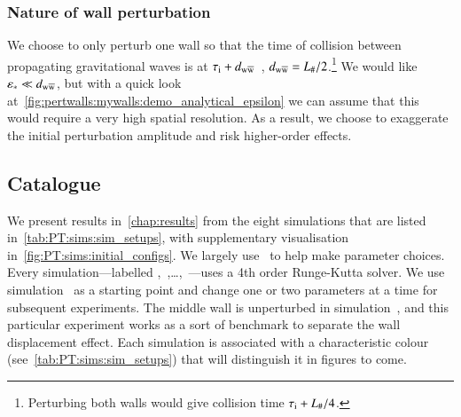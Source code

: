 \subsubsection{Nature of wall perturbation}
    We choose to only perturb one wall so that the time of collision between propagating gravitational waves is at $ \tau_\mathrm{i} + d_\mathrm{w\overline{w}}$~, $d_\mathrm{w\overline{w}}= L_\#/2$.\footnote{
        Perturbing both walls would give collision time $\tau_\mathrm{i} + L_{\#}/4$.
    } %
    We would like $\varepsilon_\ast \ll d_\mathrm{w\overline{w}}$, but with a quick look at~\cref{fig:pertwalls:mywalls:demo_analytical_epsilon} we can assume that this would require a very high spatial resolution. As a result, we choose to exaggerate the initial perturbation amplitude and risk higher-order effects. %


    







\subsection{Catalogue}

   


    We present results in~\cref{chap:results} from the eight simulations that are listed in~\cref{tab:PT:sims:sim_setups}, with supplementary visualisation in~\cref{fig:PT:sims:initial_configs}. %
    We largely use~\citet{christiansenAsimulationDomainFormation2024} to help make parameter choices. 
    Every simulation---labelled ,~,\dots,~---uses a 4th order Runge-Kutta solver. 
    We use simulation~ as a starting point and change one or two parameters at a time for subsequent experiments. The middle wall is unperturbed in simulation~, and this particular experiment works as a sort of benchmark to separate the wall displacement effect. 
    Each simulation is associated with a characteristic colour (see~\cref{tab:PT:sims:sim_setups}) that will distinguish it in figures to come.

